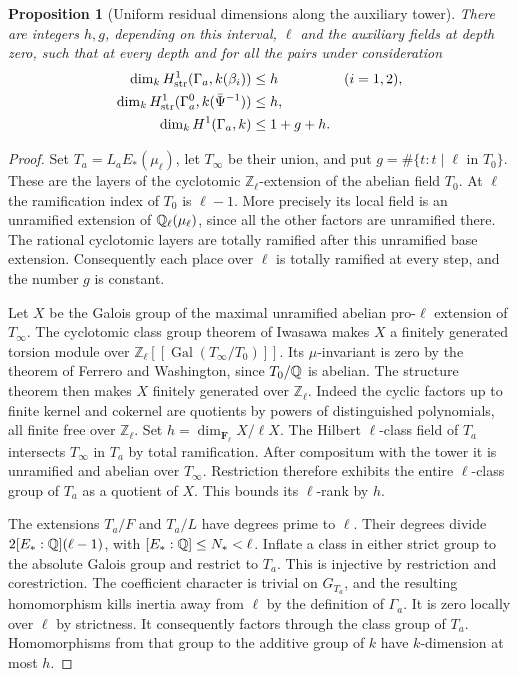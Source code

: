 \documentclass[a4paper,11pt]{article}
\newtheorem{proposition}{Proposition}[section]
\theoremstyle{definition}
\theoremstyle{remark}
\newcommand{\ZZ}{\mathbb Z}\newcommand{\ord}{\operatorname{ord}}
\numberwithin{equation}{section}
\begin{document}
\begin{proposition}[Uniform residual dimensions along the auxiliary tower]
\label{prop:classrank365}
There are integers \(h,g\), depending on this interval,
\(\ell\) and the auxiliary fields at depth zero, such that
at every depth and for all the pairs under consideration
\begin{align*}
 \dim_k H^1_{\rm str}(\Gamma_a,k(\beta_i))&\le h
                                  &&(i=1,2),\\
 \dim_k H^1_{\rm str}(\Gamma_a^0,k(\bar\Psi^{-1}))&\le h,&\\
 \dim_k H^1(\Gamma_a,k)&\le 1+g+h.&
\end{align*}
\end{proposition}
\begin{proof}
Set \(T_a=L_a E_*(\mu_\ell)\), let \(T_\infty\) be their union,
and put \(g=\#\{t:t\mid\ell\text{ in }T_0\}\).
These are the layers of the cyclotomic \(\ZZ_\ell\)-extension
of the abelian field \(T_0\). At \(\ell\) the ramification
index of \(T_0\) is \(\ell-1\). More precisely its local field
is an unramified extension of \(\mathbb Q_\ell(\mu_\ell)\), since
all the other factors are unramified there. The rational
cyclotomic layers are totally ramified after this unramified
base extension. Consequently each place over \(\ell\) is
totally ramified at every step, and the number \(g\) is
constant.

Let \(X\) be the Galois group of the maximal unramified abelian
pro-\(\ell\) extension of \(T_\infty\). The cyclotomic class
group theorem of Iwasawa makes \(X\) a finitely generated torsion
module over \(\ZZ_\ell[[\operatorname{Gal}(T_\infty/T_0)]]\).
Its \(\mu\)-invariant is zero by the theorem of Ferrero and
Washington, since \(T_0/\mathbb Q\) is abelian. The structure theorem
then makes \(X\) finitely generated over \(\ZZ_\ell\). Indeed
the cyclic factors up to finite kernel and cokernel are
quotients by powers of distinguished polynomials, all finite
free over \(\ZZ_\ell\). Set
\(h=\dim_{\mathbf F_\ell} X/\ell X\). The Hilbert
\(\ell\)-class field of \(T_a\) intersects \(T_\infty\) in
\(T_a\) by total ramification. After compositum with the tower
it is unramified and abelian over \(T_\infty\). Restriction
therefore exhibits the entire \(\ell\)-class group of \(T_a\)
as a quotient of \(X\). This bounds its \(\ell\)-rank by
\(h\).~\cite{VII-V-II-fw13,VII-V-II-iwasawa15}

The extensions \(T_a/F\) and \(T_a/L\) have degrees prime to
\(\ell\). Their degrees divide
\(2[E_*:\mathbb Q](\ell-1)\), with \([E_*:\mathbb Q]\le N_*<\ell\).
Inflate a class in either strict group to the absolute Galois
group and restrict to \(T_a\). This is injective by
restriction and corestriction. The coefficient character is
trivial on \(G_{T_a}\), and the resulting homomorphism kills
inertia away from \(\ell\) by the definition of \(\Gamma_a\).
It is zero locally over \(\ell\) by strictness. It consequently
factors through the class group of \(T_a\). Homomorphisms from
that group to the additive group of \(k\) have \(k\)-dimension
at most \(h\).


\end{proof}
\end{document}
